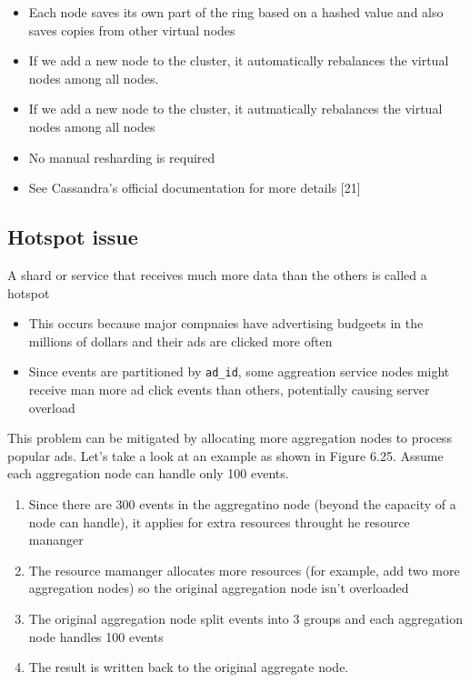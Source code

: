 \documentclass{report}
\theoremstyle{definition}
\let\oldsubsection\subsection
\renewcommand{\subsection}{\oldsubsection*}
\begin{document}
\begin{itemize}
\item
Each node saves its own part of the ring based on a hashed value and also saves copies from other virtual nodes
\item
If we add a new node to the cluster, it automatically rebalances the virtual nodes among all nodes.
\item
If we add a new node to the cluster, it autmatically rebalances the virtual nodes among all nodes
\item
No manual resharding is required
\item
See Cassandra's official documentation for more details [21]
\end{itemize}

\subsection{Hotspot issue}

A shard or service that receives much more data than the others is called a hotspot

\begin{itemize}
\item
This occurs because major compnaies have advertising budgeets in the millions of dollars and their ads are clicked more often
\item
Since events are partitioned by \lstinline|ad_id|, some aggreation service nodes might receive man more ad click events than others, potentially causing server overload
\end{itemize}

This problem can be mitigated by allocating more aggregation nodes to process popular ads. Let's take a look at an example as shown in Figure 6.25. Assume each aggregation node can handle only 100 events.

\begin{enumerate}
\item
Since there are 300 events in the aggregatino node (beyond the capacity of a node can handle), it applies for extra resources throught he resource mananger
\item
The resource mamanger allocates more resources (for example, add two more aggregation nodes) so the original aggregation node isn't overloaded
\item
The original aggregation node split events into 3 groups and each aggregation node handles 100 events
\item
The result is written back to the original aggregate node.
\end{enumerate}
\end{document}
